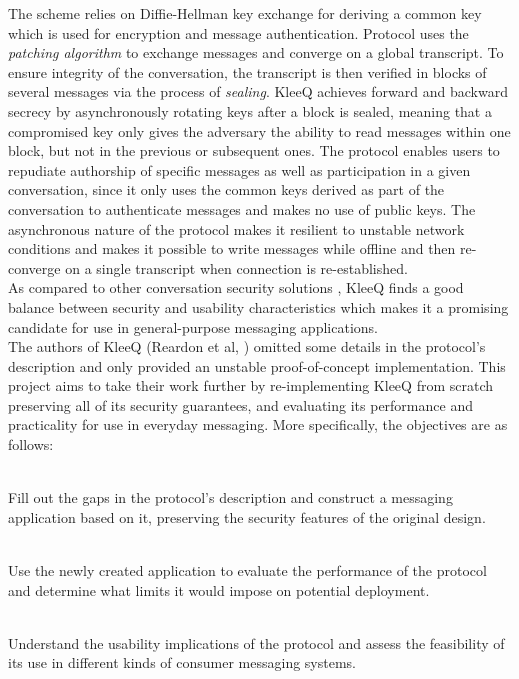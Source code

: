\documentclass[a4paper, 12pt]{report}
\begin{document}
The scheme relies on Diffie-Hellman key exchange for deriving a common key which is used for encryption and message authentication. Protocol uses the \emph{patching algorithm} to exchange messages and converge on a global transcript. To ensure integrity of the conversation, the transcript is then verified in blocks of several messages via the process of \emph{sealing}. KleeQ achieves forward and backward secrecy by asynchronously rotating keys after a block is sealed, meaning that a compromised key only gives the adversary the ability to read messages within one block, but not in the previous or subsequent ones. The protocol enables users to repudiate authorship of specific messages as well as participation in a given conversation, since it only uses the common keys derived as part of the conversation to authenticate messages and makes no use of public keys. The asynchronous nature of the protocol makes it resilient to unstable network conditions and makes it possible to write messages while offline and then re-converge on a single transcript when connection is re-established. \\

As compared to other conversation security solutions \cite{unger2015sok}, KleeQ finds a good balance between security and usability characteristics which makes it a promising candidate for use in general-purpose messaging applications. \\

The authors of KleeQ (Reardon et al, \cite{reardon2007kleeq}) omitted some details in the protocol's description and only provided an unstable proof-of-concept implementation. This project aims to take their work further by re-implementing KleeQ from scratch preserving all of its security guarantees, and evaluating its performance and practicality for use in everyday messaging. More specifically, the objectives are as follows:

\begin{description}[labelindent=0.5cm, leftmargin=1.3cm, rightmargin=0.5cm]
    \item[Implementation] \hfill \\
        Fill out the gaps in the protocol's description and construct a messaging application based on it, preserving the security features of the original design.
        
    \item[Evaluation of Performance] \hfill \\
        Use the newly created application to evaluate the performance of the protocol and determine what limits it would impose on potential deployment.
        
    \item[Evaluation of Usability] \hfill \\
        Understand the usability implications of the protocol and assess the feasibility of its use in different kinds of consumer messaging systems.

\end{description}
\end{document}
